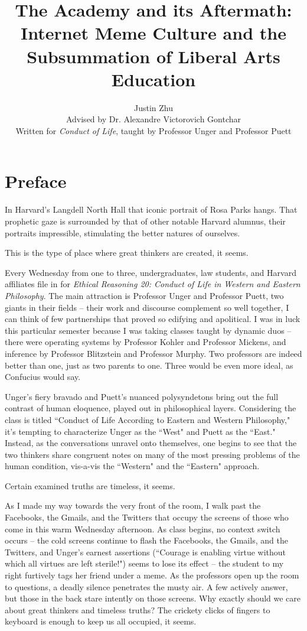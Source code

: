 \documentclass[12pt,letterpaper]{article}
\author{Justin Zhu \\ Advised by Dr. Alexandre Victorovich Gontchar \\ Written for \textit{Conduct of Life}, taught by Professor Unger and Professor Puett}
\title{The Academy and its Aftermath: Internet Meme Culture and the Subsummation of Liberal Arts Education}
\date{}
\begin{document}
\clearpage\maketitle
\thispagestyle{empty}
\pagebreak
\tableofcontents
\pagebreak
\pagestyle{plain}
\setcounter{page}{1}


\section*{Preface}
In Harvard's Langdell North Hall that iconic portrait of Rosa Parks hangs.  That prophetic gaze is surrounded by that of other notable Harvard alumnus, their portraits impressible, stimulating the better natures of ourselves.  

This is the type of place where great thinkers are created, it seems.

Every Wednesday from one to three, undergraduates, law students, and Harvard affiliates file in for \textit{Ethical Reasoning 20: Conduct of Life in Western and Eastern Philosophy}.  The main attraction is Professor Unger and Professor Puett, two giants in their fields -- their work and discourse complement so well together, I can think of few partnerships that proved so edifying and apolitical.  I was in luck this particular semester because I was taking classes taught by dynamic duos -- there were operating systems by Professor Kohler and Professor Mickens, and inference by Professor Blitzstein and Professor Murphy.  Two professors are indeed better than one, just as two parents to one.  Three would be even more ideal, as Confucius would say.

Unger's fiery bravado and Puett's nuanced polysyndetons bring out the full contrast of human eloquence, played out in philosophical layers.  Considering the class is titled ``Conduct of Life According to Eastern and Western Philosophy," it's tempting to characterize Unger as the ``West" and Puett as the ``East."  Instead, as the conversations unravel onto themselves, one begins to see that the two thinkers share congruent notes on many of the most pressing problems of the human condition, vis-a-vis the ``Western" and the ``Eastern" approach.  

Certain examined truths are timeless, it seems.

As I made my way towards the very front of the room, I walk past the Facebooks, the Gmails, and the Twitters that occupy the screens of those who come in this warm Wednesday afternoon.  As class begins, no context switch occurs -- the cold screens continue to flash the Facebooks, the Gmails, and the Twitters, and Unger's earnest assertions (``Courage is enabling virtue without which all virtues are left sterile!") seems to lose its effect -- the student to my right furtively tags her friend under a meme.   As the professors open up the room to questions, a deadly silence penetrates the musty air.  A few actively answer, but those in the back stare intently on those screens.  Why exactly should we care about great thinkers and timeless truths?  The crickety clicks of fingers to keyboard is enough to keep us all occupied, it seems.
\end{document}
